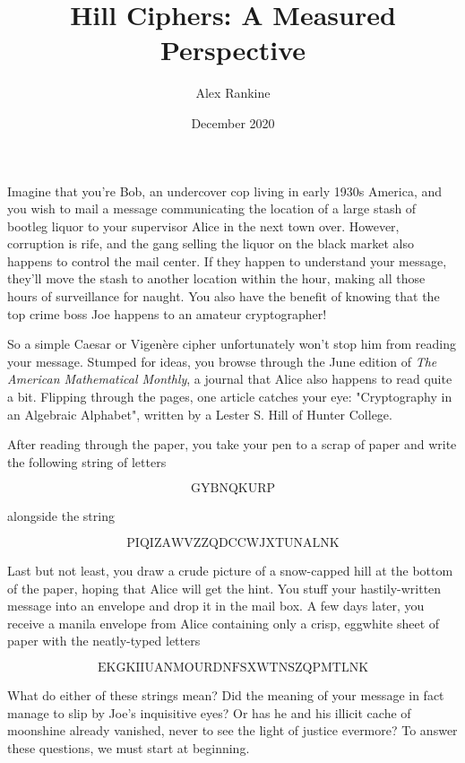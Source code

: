 \documentclass{paper}
\title{Hill Ciphers: A Measured Perspective}
\author{Alex Rankine }
\date{December 2020}
\begin{document}
\maketitle

Imagine that you're Bob, an undercover cop living in early 1930s America, and you wish to mail a message communicating the location of a large stash of bootleg liquor to your supervisor Alice in the next town over. However, corruption is rife, and the gang selling the liquor on the black market also happens to control the mail center. If they happen to understand your message, they'll move the stash to another location within the hour, making all those hours of surveillance for naught. You also have the benefit of knowing that the top crime boss Joe happens to an amateur cryptographer! 

\medskip
So a simple Caesar or Vigenère cipher unfortunately won't stop him from reading your message. Stumped for ideas, you browse through the June edition of \textit{The American Mathematical Monthly}, a journal that Alice also happens to read quite a bit. Flipping through the pages, one article catches your eye: "Cryptography in an Algebraic Alphabet", written by a Lester S. Hill of Hunter College.

\medskip
After reading through the paper, you take your pen to a scrap of paper and write the following string of letters 

\[ \mathrm{GYBNQKURP} \]

alongside the string

\[ \mathrm{PIQIZAWVZZQDCCWJXTUNALNK} \]

Last but not least, you draw a crude picture of a snow-capped hill at the bottom of the paper, hoping that Alice will get the hint. You stuff your hastily-written message into an envelope and drop it in the mail box. A few days later, you receive a manila envelope from Alice containing only a crisp, eggwhite sheet of paper with the neatly-typed letters

\[ \mathrm{EKGKIIUANMOURDNFSXWTNSZQPMTLNK} \]

What do either of these strings mean? Did the meaning of your message in fact manage to slip by Joe's inquisitive eyes? Or has he and his illicit cache of moonshine already vanished, never to see the light of justice evermore? To answer these questions, we must start at beginning.

\newpage

\tableofcontents

\clearpage
\end{document}

